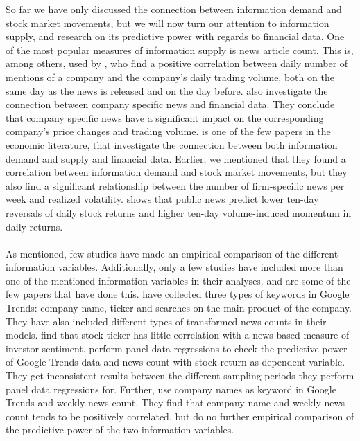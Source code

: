 So far we have only discussed the connection between information demand and stock market movements, but we will now turn our attention to information supply, and research on its predictive power with regards to financial data. One of the most popular measures of information supply is news article count. This is, among others, used by \cite{preis2013}, who find a positive correlation between daily number of mentions of a company and the company's daily trading volume, both on the same day as the news is released and on the day before. \cite{ryan} also investigate the connection between company specific news and financial data. They conclude that company specific news have a significant impact on the corresponding company's price changes and trading volume. \cite{vlastakis} is one of the few papers in the economic literature, that investigate the connection between both information demand and supply and financial data. Earlier, we mentioned that they found a correlation between information demand and stock market movements, but they also find a significant relationship between the number of firm-specific news per week and realized volatility. \cite{tetlock} shows that public news predict lower ten-day reversals of daily stock returns and higher ten-day volume-induced momentum in daily returns.  
\\\\
As mentioned, few studies have made an empirical comparison of the different information variables. Additionally, only a few studies have included more than one of the mentioned information variables in their analyses. \cite{vlastakis} and \cite{engelberg} are some of the few papers that have done this. \cite{engelberg} have collected three types of keywords in Google Trends: company name, ticker and searches on the main product of the company. They have also included different types of transformed news counts in their models. \cite{engelberg} find that stock ticker has little correlation with a news-based measure of investor sentiment. \cite{engelberg} perform panel data regressions to check the predictive power of Google Trends data and news count with stock return as dependent variable. They get inconsistent results between the different sampling periods they perform panel data regressions for. Further, \cite{vlastakis} use company names as keyword in Google Trends and weekly news count. They find that company name and weekly news count tends to be positively correlated, but do no further empirical comparison of the predictive power of the two information variables. 
\\\\
